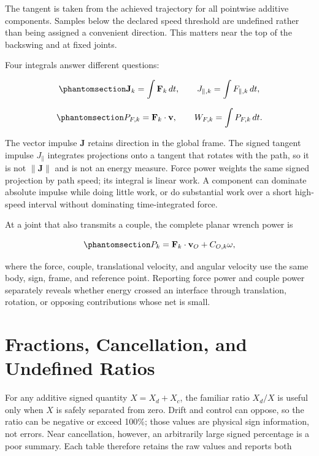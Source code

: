 \documentclass[
  letterpaper,
]{report}
\begin{document}
The tangent is taken from the achieved trajectory for all pointwise
additive components. Samples below the declared speed threshold are
undefined rather than being assigned a convenient direction. This
matters near the top of the backswing and at fixed joints.

Four integrals answer different questions:

\begin{equation}\phantomsection\label{eq-impulse-pair}{
\mathbf J_k=\int\mathbf F_k\,dt,
\qquad
J_{\parallel,k}=\int F_{\parallel,k}\,dt,
}\end{equation}

\begin{equation}\phantomsection\label{eq-force-power-work}{
P_{F,k}=\mathbf F_k\cdot\mathbf v,
\qquad
W_{F,k}=\int P_{F,k}\,dt.
}\end{equation}

The vector impulse \(\mathbf J\) retains direction in the global frame.
The signed tangent impulse \(J_\parallel\) integrates projections onto a
tangent that rotates with the path, so it is not
\(\lVert\mathbf J\rVert\) and is not an energy measure. Force power
weights the same signed projection by path speed; its integral is linear
work. A component can dominate absolute impulse while doing little work,
or do substantial work over a short high-speed interval without
dominating time-integrated force.

At a joint that also transmits a couple, the complete planar wrench
power is

\begin{equation}\phantomsection\label{eq-interface-wrench-power}{
P_k=\mathbf F_k\cdot\mathbf v_O+C_{O,k}\omega,
}\end{equation}

where the force, couple, translational velocity, and angular velocity
use the same body, sign, frame, and reference point. Reporting force
power and couple power separately reveals whether energy crossed an
interface through translation, rotation, or opposing contributions whose
net is small.

\section{Fractions, Cancellation, and Undefined
Ratios}\label{sec-attribution-fractions}

For any additive signed quantity \(X=X_d+X_c\), the familiar ratio
\(X_d/X\) is useful only when \(X\) is safely separated from zero. Drift
and control can oppose, so the ratio can be negative or exceed 100\%;
those values are physical sign information, not errors. Near
cancellation, however, an arbitrarily large signed percentage is a poor
summary. Each table therefore retains the raw values and reports both
\end{document}
